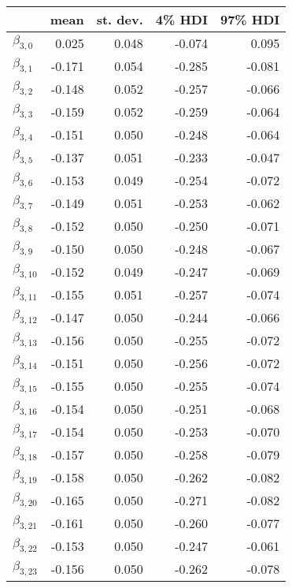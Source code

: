 \begin{tabular}{lrrrr}
\toprule
{} &   mean &  st. dev. &  4\% HDI &  97\% HDI \\
\midrule
$\beta_{3,0}$  &  0.025 &     0.048 &   -0.074 &     0.095 \\
$\beta_{3,1}$  & -0.171 &     0.054 &   -0.285 &    -0.081 \\
$\beta_{3,2}$  & -0.148 &     0.052 &   -0.257 &    -0.066 \\
$\beta_{3,3}$  & -0.159 &     0.052 &   -0.259 &    -0.064 \\
$\beta_{3,4}$  & -0.151 &     0.050 &   -0.248 &    -0.064 \\
$\beta_{3,5}$  & -0.137 &     0.051 &   -0.233 &    -0.047 \\
$\beta_{3,6}$  & -0.153 &     0.049 &   -0.254 &    -0.072 \\
$\beta_{3,7}$  & -0.149 &     0.051 &   -0.253 &    -0.062 \\
$\beta_{3,8}$  & -0.152 &     0.050 &   -0.250 &    -0.071 \\
$\beta_{3,9}$  & -0.150 &     0.050 &   -0.248 &    -0.067 \\
$\beta_{3,10}$ & -0.152 &     0.049 &   -0.247 &    -0.069 \\
$\beta_{3,11}$ & -0.155 &     0.051 &   -0.257 &    -0.074 \\
$\beta_{3,12}$ & -0.147 &     0.050 &   -0.244 &    -0.066 \\
$\beta_{3,13}$ & -0.156 &     0.050 &   -0.255 &    -0.072 \\
$\beta_{3,14}$ & -0.151 &     0.050 &   -0.256 &    -0.072 \\
$\beta_{3,15}$ & -0.155 &     0.050 &   -0.255 &    -0.074 \\
$\beta_{3,16}$ & -0.154 &     0.050 &   -0.251 &    -0.068 \\
$\beta_{3,17}$ & -0.154 &     0.050 &   -0.253 &    -0.070 \\
$\beta_{3,18}$ & -0.157 &     0.050 &   -0.258 &    -0.079 \\
$\beta_{3,19}$ & -0.158 &     0.050 &   -0.262 &    -0.082 \\
$\beta_{3,20}$ & -0.165 &     0.050 &   -0.271 &    -0.082 \\
$\beta_{3,21}$ & -0.161 &     0.050 &   -0.260 &    -0.077 \\
$\beta_{3,22}$ & -0.153 &     0.050 &   -0.247 &    -0.061 \\
$\beta_{3,23}$ & -0.156 &     0.050 &   -0.262 &    -0.078 \\

\end{tabular}
